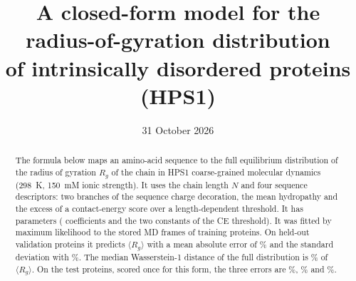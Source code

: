 \documentclass[11pt]{article}
\title{A closed-form model for the radius-of-gyration distribution\\ of intrinsically disordered proteins (HPS1)}
\date{31 October 2026}
\author{}
\newcommand{\Rg}{R_g}
\begin{document}
\maketitle

\begin{abstract}
\noindent
The formula below maps an amino-acid sequence to the full equilibrium distribution of the radius of gyration $\Rg$ of
the chain in HPS1 coarse-grained molecular dynamics (298~K, 150~mM ionic strength). It uses the chain length $N$ and
four sequence descriptors: two branches of the sequence charge decoration, the mean hydropathy and the excess of a
contact-energy score over a length-dependent threshold. It has  parameters ( coefficients and the two constants of the CE
threshold). It was fitted by maximum likelihood to the stored MD frames of  training proteins. On
 held-out validation proteins it predicts $\langle\Rg\rangle$ with a mean absolute error of
\% and the standard deviation with \%. The median Wasserstein-1
distance of the full distribution is \% of $\langle\Rg\rangle$. On the  test
proteins, scored once for this form, the three errors are \%, \% and
\%.
\end{abstract}

\end{document}
